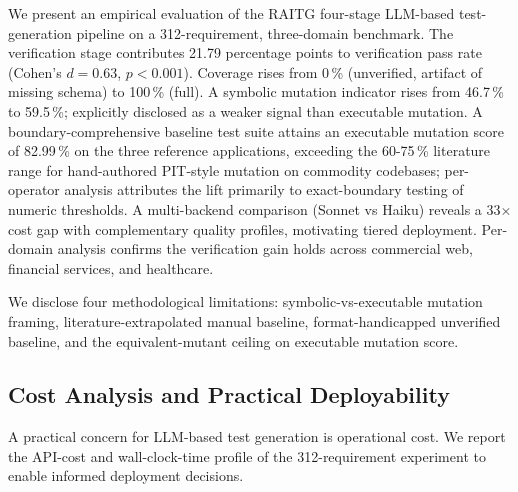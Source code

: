 \documentclass[sigconf,nonacm,review]{acmart}
\begin{document}
We present an empirical evaluation of the RAITG four-stage
LLM-based test-generation pipeline on a 312-requirement,
three-domain benchmark. The verification stage contributes 21.79
percentage points to verification pass rate (Cohen's $d = 0.63$,
$p < 0.001$). Coverage rises from 0\,\% (unverified, artifact of
missing schema) to 100\,\% (full). A symbolic mutation indicator
rises from 46.7\,\% to 59.5\,\%; explicitly disclosed as a
weaker signal than executable mutation. A boundary-comprehensive
baseline test suite attains an executable mutation score of
82.99\,\% on the three reference applications, exceeding the
60-75\,\% literature range for hand-authored PIT-style mutation on
commodity codebases; per-operator analysis attributes the lift
primarily to exact-boundary testing of numeric thresholds. A
multi-backend comparison (Sonnet vs Haiku) reveals a 33$\times$
cost gap with complementary quality profiles, motivating tiered
deployment. Per-domain analysis confirms the verification gain
holds across commercial web, financial services, and healthcare.

We disclose four methodological limitations: symbolic-vs-executable
mutation framing, literature-extrapolated manual baseline,
format-handicapped unverified baseline, and the
equivalent-mutant ceiling on executable mutation score.



\subsection{Cost Analysis and Practical Deployability}
\label{sec:cost_e}

A practical concern for LLM-based test generation is operational
cost. We report the API-cost and wall-clock-time profile of the
312-requirement experiment to enable informed deployment decisions.
\end{document}

